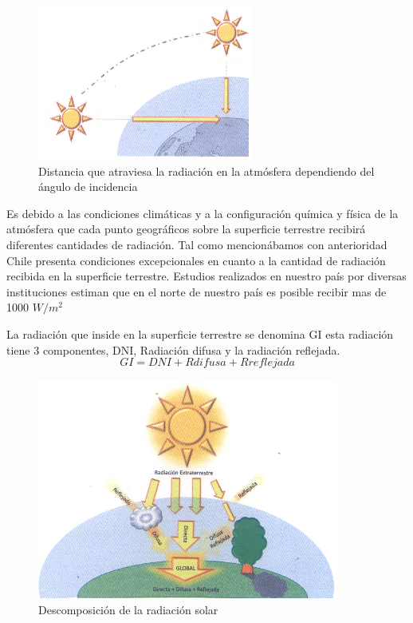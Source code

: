 \begin{figure}[h!]
        \centering
        \includegraphics[scale=0.4]{images/espesorAtmosfera}
        \caption{\tiny Distancia que atraviesa la radiación en la atmósfera dependiendo del ángulo de incidencia\cite{recursoSolar:1}}
\end{figure}

Es debido a las condiciones climáticas y a la configuración química y física de la atmósfera que cada punto geográficos sobre la superficie terrestre recibirá diferentes cantidades de radiación. Tal como mencionábamos con anterioridad Chile presenta condiciones excepcionales en cuanto a la cantidad de radiación recibida en la superficie terrestre. Estudios realizados en nuestro país por diversas instituciones estiman que en el norte de nuestro país es posible recibir mas de 1000 $W/{m}^{2}$

La radiación que inside en la superficie terrestre se denomina GI esta radiación tiene 3 componentes, DNI, Radiación difusa y la radiación reflejada. $$ GI = DNI + Rdifusa + Rreflejada $$

\begin{figure}[h!]
        \centering
        \includegraphics[scale=0.4]{images/radiacionDescompocicion}
        \caption{\tiny Descomposición de la radiación solar\cite{recursoSolar:1}}
\end{figure}

